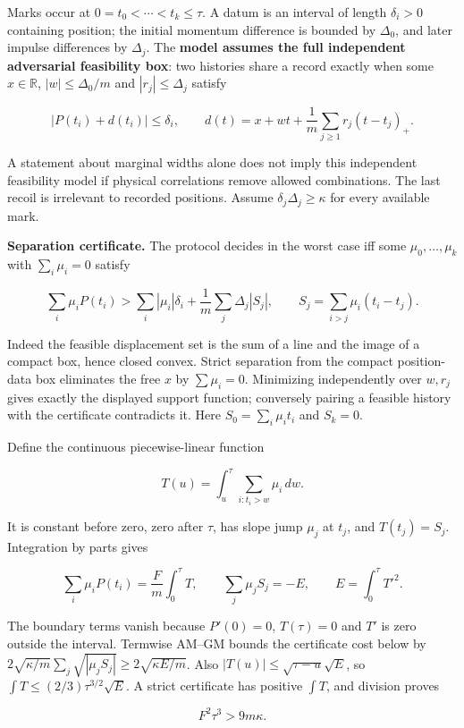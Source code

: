 \documentclass[11pt,a4paper]{article}
\begin{document}
Marks occur at \(0=t_0<\cdots<t_k\le\tau\). A datum is an interval of
length \(\delta_i>0\) containing position; the initial momentum
difference is bounded by \(\Delta_0\), and later impulse differences by
\(\Delta_j\). The \textbf{model assumes the full independent adversarial
feasibility box}: two histories share a record exactly when some
\(x\in\mathbb R\), \(|w|\le\Delta_0/m\) and \(|r_j|\le\Delta_j\) satisfy

\[|P(t_i)+d(t_i)|\le\delta_i,\qquad
d(t)=x+wt+\frac1m\sum_{j\ge1}r_j(t-t_j)_+.\]

A statement about marginal widths alone does not imply this independent
feasibility model if physical correlations remove allowed combinations.
The last recoil is irrelevant to recorded positions. Assume
\(\delta_j\Delta_j\ge\kappa\) for every available mark.

\textbf{Separation certificate.} The protocol decides in the worst case
iff some \(\mu_0,\ldots,\mu_k\) with \(\sum_i\mu_i=0\) satisfy

\[\sum_i\mu_iP(t_i)>
 \sum_i|\mu_i|\delta_i+\frac1m\sum_j\Delta_j|S_j|,\qquad
S_j=\sum_{i>j}\mu_i(t_i-t_j).\]

Indeed the feasible displacement set is the sum of a line and the image
of a compact box, hence closed convex. Strict separation from the
compact position-data box eliminates the free \(x\) by \(\sum\mu_i=0\).
Minimizing independently over \(w,r_j\) gives exactly the displayed
support function; conversely pairing a feasible history with the
certificate contradicts it. Here \(S_0=\sum_i\mu_it_i\) and \(S_k=0\).

Define the continuous piecewise-linear function

\[T(u)=\int_u^\tau\sum_{i:t_i>w}\mu_i\,dw.\]

It is constant before zero, zero after \(\tau\), has slope jump
\(\mu_j\) at \(t_j\), and \(T(t_j)=S_j\). Integration by parts gives

\[\sum_i\mu_iP(t_i)=\frac Fm\int_0^\tau T,\qquad
\sum_j\mu_jS_j=-E,\qquad E=\int_0^\tau T'^2.\]

The boundary terms vanish because \(P'(0)=0\), \(T(\tau)=0\) and \(T'\)
is zero outside the interval. Termwise AM--GM bounds the certificate
cost below by
\(2\sqrt{\kappa/m}\sum_j\sqrt{|\mu_jS_j|}\ge2\sqrt{\kappa E/m}\). Also
\(|T(u)|\le\sqrt{\tau-u}\sqrt E\), so
\(\int T\le(2/3)\tau^{3/2}\sqrt E\). A strict certificate has positive
\(\int T\), and division proves

\[\boxed{F^2\tau^3>9m\kappa.}\]
\end{document}
